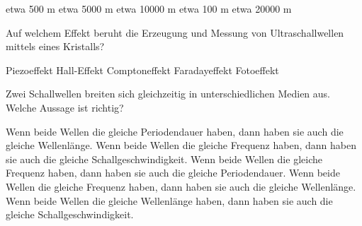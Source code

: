 \documentclass[11pt]{exam}
\begin{document}
\begin{questions}
\begin{choices}
	\choice etwa 500 m
	\choice etwa 5000 m
	\choice etwa 10000 m
	\choice etwa 100 m
	\choice etwa 20000 m
\end{choices}

\vspace{3mm}\question Auf welchem Effekt beruht die Erzeugung und Messung von Ultraschallwellen mittels eines Kristalls?

\begin{choices}
	\choice Piezoeffekt
	\choice Hall-Effekt
	\choice Comptoneffekt
	\choice Faradayeffekt
	\choice Fotoeffekt
\end{choices}

\vspace{3mm}\question Zwei Schallwellen breiten sich gleichzeitig in unterschiedlichen Medien aus. Welche Aussage ist richtig?

\begin{choices}
	\choice Wenn beide Wellen die gleiche Periodendauer haben, dann haben sie auch die gleiche Wellenlänge.
	\choice Wenn beide Wellen die gleiche Frequenz haben, dann haben sie auch die gleiche Schallgeschwindigkeit.
	\choice Wenn beide Wellen die gleiche Frequenz haben, dann haben sie auch die gleiche Periodendauer.
	\choice Wenn beide Wellen die gleiche Frequenz haben, dann haben sie auch die gleiche Wellenlänge.
	\choice Wenn beide Wellen die gleiche Wellenlänge haben, dann haben sie auch die gleiche Schallgeschwindigkeit.
\end{choices}

\vspace{3mm}\end{questions}
\end{document}
